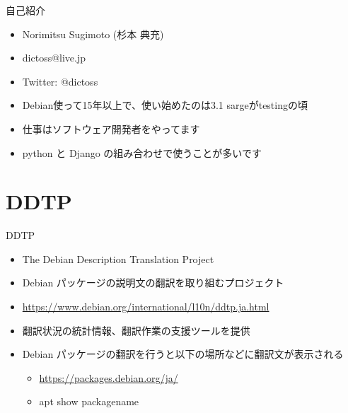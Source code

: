 \begin{frame}{自己紹介}
  \begin{itemize}
  \item Norimitsu Sugimoto (杉本 典充)
  \item dictoss@live.jp
  \item Twitter: @dictoss
  \item Debian使って15年以上で、使い始めたのは3.1 sargeがtestingの頃
  \item 仕事はソフトウェア開発者をやってます
  \item python と Django の組み合わせで使うことが多いです
  \end{itemize}
\end{frame}


\section{DDTP}

\begin{frame}{DDTP}
  \begin{itemize}
  \item The Debian Description Translation Project
  \item Debian パッケージの説明文の翻訳を取り組むプロジェクト
  \item \url{https://www.debian.org/international/l10n/ddtp.ja.html}
  \item 翻訳状況の統計情報、翻訳作業の支援ツールを提供
  \item Debian パッケージの翻訳を行うと以下の場所などに翻訳文が表示される
    \begin{itemize}
    \item \url{https://packages.debian.org/ja/}
    \item apt show packagename
    \end{itemize}
  \end{itemize}
\end{frame}

